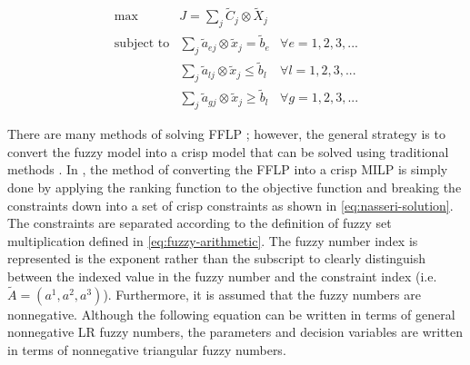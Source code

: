 \documentclass[ee,msthesis]{usuthesis}
\begin{document}
\begin{equation}
\label{eq:general-fflp}
\begin{array}{lll}
\text{max}   & J = \sum_j \tilde{C}_j \otimes \tilde{X}_j              &                 \\
\text{subject to} & \sum_j \tilde{a}_{ej} \otimes \tilde{x}_j = \tilde{b}_e &  \forall e = 1,2,3,... \\
                  & \sum_j \tilde{a}_{lj} \otimes \tilde{x}_j \le \tilde{b}_l &  \forall l = 1,2,3,... \\
                  & \sum_j \tilde{a}_{gj} \otimes \tilde{x}_j \ge \tilde{b}_l &  \forall g = 1,2,3,...
\end{array}
\end{equation}

There are many methods of solving FFLP
\cite{bello-2019-fuzzy-activ,kaur-2016-introd-fuzzy,ebrahimnejad-2016-new-method,nasseri-2013-fully}; however, the
general strategy is to convert the fuzzy model into a crisp model that can be solved using traditional methods
\cite{bello-2019-fuzzy-activ}. In \cite{nasseri-2013-fully,bello-2019-fuzzy-activ}, the method of converting the FFLP
into a crisp MILP is simply done by applying the ranking function to the objective function and breaking the constraints
down into a set of crisp constraints as shown in \ref{eq:nasseri-solution}. The constraints are separated according to the
definition of fuzzy set multiplication defined in \ref{eq:fuzzy-arithmetic}. The fuzzy number index is represented is the
exponent rather than the subscript to clearly distinguish between the indexed value in the fuzzy number and the
constraint index (i.e. \(\tilde{A} = (a^1,a^2,a^3)\)). Furthermore, it is assumed that the fuzzy numbers are nonnegative.
Although the following equation can be written in terms of general nonnegative LR fuzzy numbers, the parameters and
decision variables are written in terms of nonnegative triangular fuzzy numbers.
\end{document}
